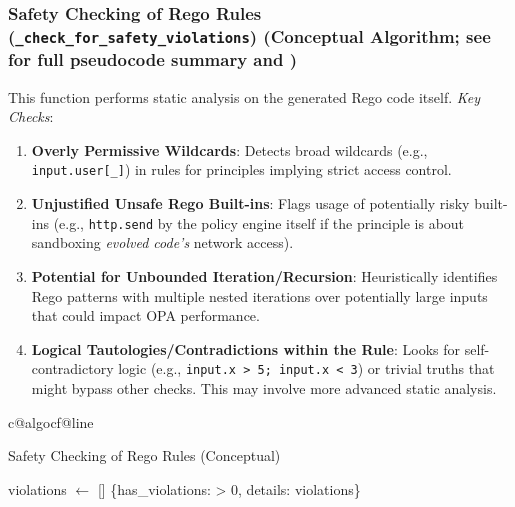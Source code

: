 \documentclass[sigconf,natbib]{acmart}
\makeatletter
\newcommand{\resetalglineno}{\setcounter{ALG@line}{0}}
\renewcommand{\resetalglineno}{%
  \setcounter{ALG@line}{0}%
  \ifcsname c@algocf@line\endcsname\setcounter{algocf@line}{0}\fi%
}
\makeatother
\begin{document}
\subsubsection[Safety Checking of Rego Rules]{Safety Checking of Rego Rules (\texttt{\_check\_for\_safety\_violations}) (Conceptual Algorithm; see  for full pseudocode summary and )}
\label{app:safety_checking_subsection}
This function performs static analysis on the generated Rego code itself. \textit{Key Checks}:
\begin{enumerate}
    \item \textbf{Overly Permissive Wildcards}: Detects broad wildcards (e.g., \texttt{input.user[\_]}) in rules for principles implying strict access control.
    \item \textbf{Unjustified Unsafe Rego Built-ins}: Flags usage of potentially risky built-ins (e.g., \texttt{http.send} by the policy engine itself if the principle is about sandboxing \textit{evolved code's} network access).
    \item \textbf{Potential for Unbounded Iteration/Recursion}: Heuristically identifies Rego patterns with multiple nested iterations over potentially large inputs that could impact OPA performance.
    \item \textbf{Logical Tautologies/Contradictions within the Rule}: Looks for self-contradictory logic (e.g., \texttt{input.x > 5; input.x < 3}) or trivial truths that might bypass other checks. This may involve more advanced static analysis.
\end{enumerate}

\begin{algorithm}[!htbp]
\resetalglineno
\caption{Safety Checking of Rego Rules (Conceptual)}
\label{alg:safety_check_conceptual_appendix}
\begin{algorithmic}[1]
  \State violations $\gets$ []
    \State {}
  \EndIf
    \State {}
  \EndIf
    \State {}
  \EndIf
  \State \Return \{has\_violations:  > 0, details: violations\}
\EndFunction
\end{algorithmic}
\end{algorithm}
\end{document}
